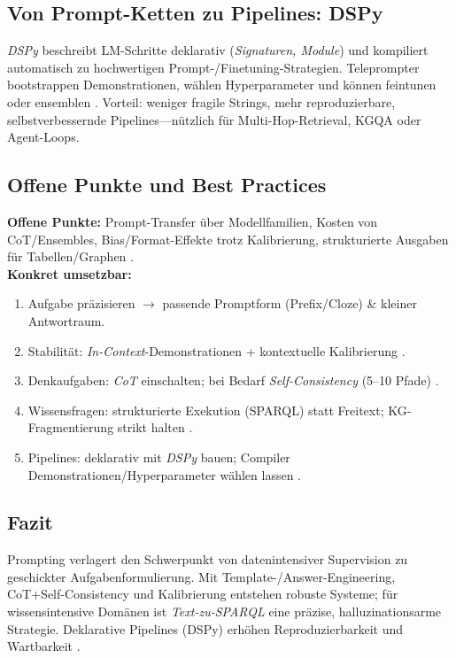 \subsection{Von Prompt-Ketten zu Pipelines: DSPy}
\emph{DSPy} beschreibt LM-Schritte deklarativ (\emph{Signaturen, Module}) und kompiliert automatisch zu hochwertigen Prompt-/Finetuning-Strategien. Teleprompter bootstrappen Demonstrationen, wählen Hyperparameter und können feintunen oder ensemblen \cite{khattab2023dspy}. Vorteil: weniger fragile Strings, mehr reproduzierbare, selbstverbessernde Pipelines—nützlich für Multi-Hop-Retrieval, KGQA oder Agent-Loops.

\subsection{Offene Punkte und Best Practices}
\textbf{Offene Punkte:} Prompt-Transfer über Modellfamilien, Kosten von CoT/Ensembles, Bias/Format-Effekte trotz Kalibrierung, strukturierte Ausgaben für Tabellen/Graphen \cite{liu2023survey,zhao2021calibrate}.\\
\textbf{Konkret umsetzbar:}
\begin{enumerate}
  \item Aufgabe präzisieren $\rightarrow$ passende Promptform (Prefix/Cloze) \& kleiner Antwortraum.
  \item Stabilität: \emph{In-Context}-Demonstrationen + kontextuelle Kalibrierung \cite{zhao2021calibrate}.
  \item Denkaufgaben: \emph{CoT} einschalten; bei Bedarf \emph{Self-Consistency} (5–10 Pfade) \cite{wei2022cot,wang2022selfconsistency}.
  \item Wissensfragen: strukturierte Exekution (SPARQL) statt Freitext; KG-Fragmentierung strikt halten \cite{avila2024autokgqagpt}.
  \item Pipelines: deklarativ mit \emph{DSPy} bauen; Compiler Demonstrationen/Hyperparameter wählen lassen \cite{khattab2023dspy}.
\end{enumerate}

\subsection{Fazit}
Prompting verlagert den Schwerpunkt von datenintensiver Supervision zu geschickter Aufgabenformulierung. Mit Template-/Answer-Engineering, CoT+Self-Consistency und Kalibrierung entstehen robuste Systeme; für wissensintensive Domänen ist \emph{Text-zu-SPARQL} eine präzise, halluzinationsarme Strategie. Deklarative Pipelines (DSPy) erhöhen Reproduzierbarkeit und Wartbarkeit \cite{liu2023survey,wei2022cot,wang2022selfconsistency,zhao2021calibrate,avila2024autokgqagpt,khattab2023dspy}.






